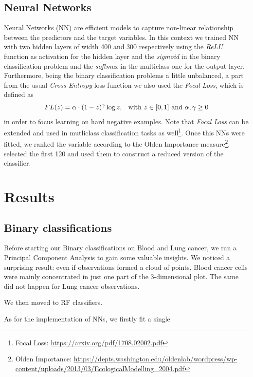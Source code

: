 \documentclass[a4paper,11pt, oneside]{article}  %
\begin{document}
\subsection{Neural Networks}
Neural Networks (NN) are efficient models to capture non-linear relationship between the predictors and the target variables.  In this context we trained NN with two hidden layers of width 400 and 300 respectively using  the \textit{ReLU} function as activation  for the hidden layer and the \textit{sigmoid} in the binary classification problem and the \textit{softmax} in the multiclass one for the output layer.  Furthermore,  being the binary classification problems a little unbalanced,  a part from the usual \textit{Cross Entropy} loss function we also used the \textit{Focal Loss}, which is defined as $$ FL(z) = \alpha \cdot (1 - z)^{\gamma} \log{z} \text{,  \hspace{3pt} with }z \in [0,1]  \text{ and } \alpha,  \gamma \geq 0$$ in order to focus learning on hard negative examples.  Note that \textit{Focal Loss} can be extended and used in mutliclass classification tasks as well\footnote{Focal Loss: \url{https://arxiv.org/pdf/1708.02002.pdf}}.  Once this NNs were fitted,  we ranked the variable according to the Olden Importance measure\footnote{Olden Importance: \url{https://depts.washington.edu/oldenlab/wordpress/wp-content/uploads/2013/03/EcologicalModelling_2004.pdf}}, selected the first 120 and used them to construct a reduced version of the classifier.



\section{Results}
\subsection{Binary classifications}

Before starting our Binary classifications on Blood and Lung cancer, we ran a Principal Component Analysis to gain some valuable insights. We noticed a surprising result: even if observations formed a cloud of points, Blood cancer cells were mainly concentrated in just one part of the 3-dimensional plot. The same did not happen for Lung cancer observations.

We then moved to RF classifiers.  %



As for the implementation of NNs,  we firstly fit a single 
\end{document}
